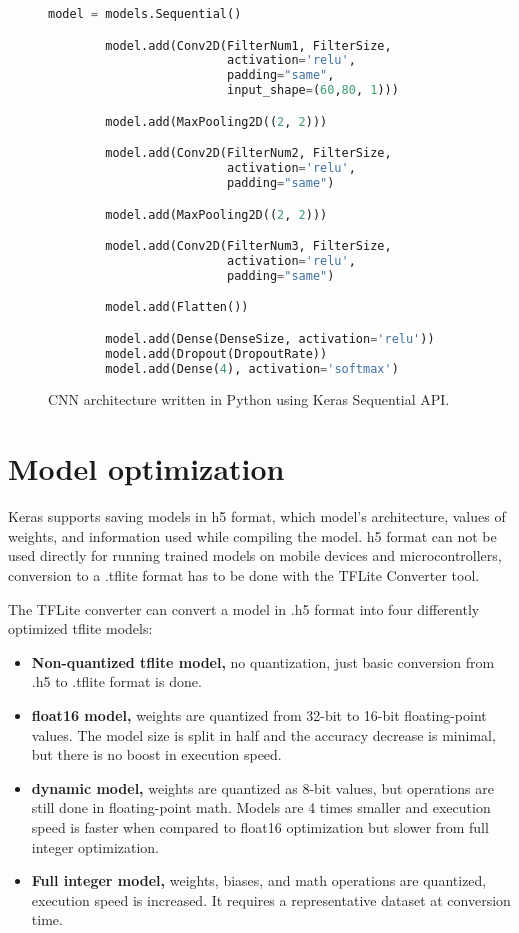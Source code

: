 \lstset{style=mystyle}
\begin{figure}[ht] 
    \begin{lstlisting}[language=Python]
        model = models.Sequential()

        model.add(Conv2D(FilterNum1, FilterSize, 
                         activation='relu', 
                         padding="same", 
                         input_shape=(60,80, 1)))

        model.add(MaxPooling2D((2, 2)))

        model.add(Conv2D(FilterNum2, FilterSize, 
                         activation='relu', 
                         padding="same")

        model.add(MaxPooling2D((2, 2)))

        model.add(Conv2D(FilterNum3, FilterSize, 
                         activation='relu', 
                         padding="same")

        model.add(Flatten())

        model.add(Dense(DenseSize, activation='relu'))
        model.add(Dropout(DropoutRate))
        model.add(Dense(4), activation='softmax')
    \end{lstlisting}
    \caption{ CNN architecture written in Python using Keras Sequential API.}
    \label{model_code}
\end{figure}


\section{ Model optimization}

Keras supports saving models in h5 format, which model's architecture, values of weights, and information used while compiling the model.
h5 format can not be used directly for running trained models on mobile devices and microcontrollers, conversion to a .tflite format has to be done with the TFLite Converter tool.

The TFLite converter can convert a model in .h5 format into four differently optimized tflite models:
\begin{itemize}
    \item \textbf{Non-quantized tflite model,} no quantization, just basic conversion from .h5 to .tflite format is done.
    \item \textbf{float16 model,} weights are quantized from 32-bit to 16-bit floating-point values. The model size is split in half and the accuracy decrease is minimal, but there is no boost in execution speed.
    \item \textbf{dynamic model,} weights are quantized as 8-bit values, but operations are still done in floating-point math. Models are 4 times smaller and execution speed is faster when compared to float16 optimization but slower from full integer optimization.
    \item \textbf{Full integer model,} weights, biases, and math operations are quantized, execution speed is increased. It requires a representative dataset at conversion time.
\end{itemize}

